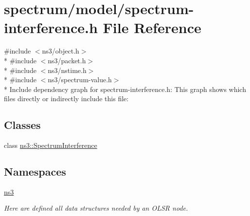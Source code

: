 \hypertarget{spectrum-interference_8h}{}\section{spectrum/model/spectrum-\/interference.h File Reference}
\label{spectrum-interference_8h}
{\ttfamily \#include $<$ns3/object.\+h$>$}\\*
{\ttfamily \#include $<$ns3/packet.\+h$>$}\\*
{\ttfamily \#include $<$ns3/nstime.\+h$>$}\\*
{\ttfamily \#include $<$ns3/spectrum-\/value.\+h$>$}\\*
Include dependency graph for spectrum-\/interference.h\+:
This graph shows which files directly or indirectly include this file\+:
\subsection*{Classes}
\begin{DoxyCompactItemize}
\item 
class \hyperlink{classns3_1_1SpectrumInterference}{ns3\+::\+Spectrum\+Interference}
\end{DoxyCompactItemize}
\subsection*{Namespaces}
\begin{DoxyCompactItemize}
\item 
 \hyperlink{namespacens3}{ns3}
\begin{DoxyCompactList}\small\item\em Here are defined all data structures needed by an O\+L\+SR node. \end{DoxyCompactList}\end{DoxyCompactItemize}
